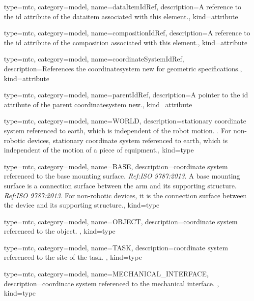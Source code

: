 {
  type=mtc,
  category=model,
  name={dataItemIdRef},
  description={A reference to the \gls{id} attribute of the \gls{dataitem} associated with this element.},
  kind={attribute}
}


{
  type=mtc,
  category=model,
  name={compositionIdRef},
  description={A reference to the \gls{id} attribute of the \gls{composition} associated with this element.},
  kind={attribute}
}


{
  type=mtc,
  category=model,
  name={coordinateSystemIdRef},
  description={References the \gls{coordinatesystem new} for geometric \gls{specifications}.},
  kind={attribute}
}


{
  type=mtc,
  category=model,
  name={parentIdRef},
  description={A pointer to the \gls{id} attribute of the parent \gls{coordinatesystem new}.},
  kind={attribute}
}


{
  type=mtc,
  category=model,
  name={WORLD},
  description={stationary coordinate system referenced to earth, which is independent of the robot motion. .
  \newline For non-robotic devices, stationary coordinate system referenced to earth, which is independent of the motion of a piece of equipment.},
  kind={type}
}


{
  type=mtc,
  category=model,
  name={BASE},
  description={coordinate system referenced to the base mounting surface. \textit{Ref:ISO 9787:2013}.
  \newline A base mounting surface is a connection surface between the arm and its supporting structure. \textit{Ref:ISO 9787:2013}.
  \newline For non-robotic devices, it is the connection surface between the device and its supporting structure.},
  kind={type}
}


{
  type=mtc,
  category=model,
  name={OBJECT},
  description={coordinate system referenced to the object. },
  kind={type}
}


{
  type=mtc,
  category=model,
  name={TASK},
  description={coordinate system referenced to the site of the task. },
  kind={type}
}


{
  type=mtc,
  category=model,
  name={MECHANICAL\_INTERFACE},
  description={coordinate system referenced to the mechanical interface. },
  kind={type}
}


